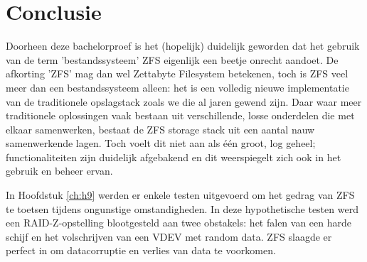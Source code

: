 
\chapter{Conclusie}
\label{ch:conclusie}



Doorheen deze bachelorproef is het (hopelijk) duidelijk geworden dat het gebruik van de term 'bestandssysteem' ZFS eigenlijk een beetje onrecht aandoet. De afkorting 'ZFS' mag dan wel Zettabyte Filesystem betekenen, toch is ZFS veel meer dan een bestandssysteem alleen: het is een volledig nieuwe implementatie van de traditionele opslagstack zoals we die al jaren gewend zijn. Daar waar meer traditionele oplossingen vaak bestaan uit verschillende, losse onderdelen die met elkaar samenwerken, bestaat de ZFS storage stack uit een aantal nauw samenwerkende lagen. Toch voelt dit niet aan als één groot, log geheel; functionaliteiten zijn duidelijk afgebakend en dit weerspiegelt zich ook in het gebruik en beheer ervan.   

In Hoofdstuk \ref{ch:h9} werden er enkele testen uitgevoerd om het gedrag van ZFS te toetsen tijdens ongunstige omstandigheden. In deze hypothetische testen werd een RAID-Z-opstelling blootgesteld aan twee obstakels: het falen van een harde schijf en het volschrijven van een VDEV met random data. ZFS slaagde er perfect in om datacorruptie en verlies van data te voorkomen. 


